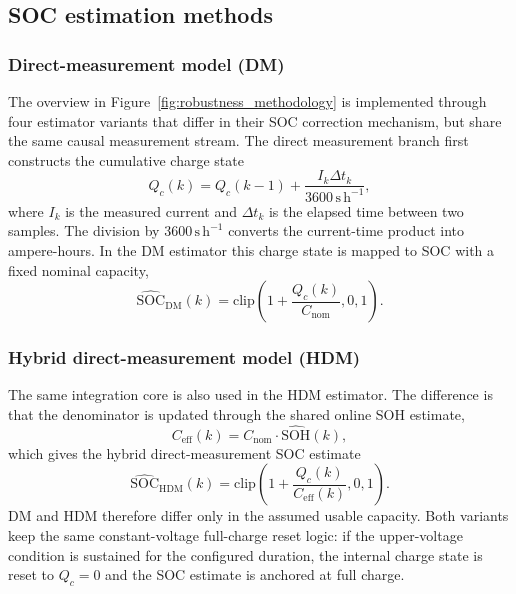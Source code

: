 \documentclass[
    a4paper,
    12pt,
    titlepage,
    bibliography=totoc,
    twoside=on,
    parskip=false,
    numbers=noenddot,
    cleardoublepage=empty,
    DIV=12,
    BCOR=12.0mm,
    headheight=36pt,
    headings=openright
]{scrreprt}
\begin{document}
\subsection{SOC estimation methods}
\subsubsection{Direct-measurement model (DM)}
The overview in Figure~\ref{fig:robustness_methodology} is implemented through four estimator variants that differ in their SOC correction mechanism, but share the same causal measurement stream. The direct measurement branch first constructs the cumulative charge state
\begin{equation}
    Q_c(k)=Q_c(k-1)+\frac{I_k\Delta t_k}{3600\,\mathrm{s\,h^{-1}}},
    \label{eq:robustness_qc_update}
\end{equation}
where $I_k$ is the measured current and $\Delta t_k$ is the elapsed time between two samples. The division by $3600\,\mathrm{s\,h^{-1}}$ converts the current-time product into ampere-hours. In the DM estimator this charge state is mapped to SOC with a fixed nominal capacity,
\begin{equation}
    \widehat{\mathrm{SOC}}_{\mathrm{DM}}(k)
    =
    \mathrm{clip}\!\left(1+\frac{Q_c(k)}{C_{\mathrm{nom}}},0,1\right).
    \label{eq:robustness_soc_dm}
\end{equation}

\subsubsection{Hybrid direct-measurement model (HDM)}
The same integration core is also used in the HDM estimator. The difference is that the denominator is updated through the shared online SOH estimate,
\begin{equation}
    C_{\mathrm{eff}}(k)=C_{\mathrm{nom}}\cdot\widehat{\mathrm{SOH}}(k),
    \label{eq:robustness_ceff}
\end{equation}
which gives the hybrid direct-measurement SOC estimate
\begin{equation}
    \widehat{\mathrm{SOC}}_{\mathrm{HDM}}(k)
    =
    \mathrm{clip}\!\left(1+\frac{Q_c(k)}{C_{\mathrm{eff}}(k)},0,1\right).
    \label{eq:robustness_soc_hdm}
\end{equation}
DM and HDM therefore differ only in the assumed usable capacity. Both variants keep the same constant-voltage full-charge reset logic: if the upper-voltage condition is sustained for the configured duration, the internal charge state is reset to $Q_c=0$ and the SOC estimate is anchored at full charge.
\end{document}
